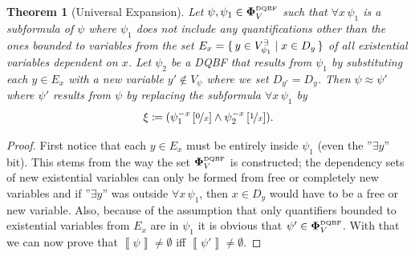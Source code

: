 \documentclass[
  digital, %
  twoside, %
  table,   %
  nolof,     %
  nolot,     %
]{fithesis3}
\let\setbuilder\set
\newcommand{\simpleset}[1]{\{{#1}\}}
\renewcommand{\set}[1]{\normalexpandarg\IfSubStr{#1}{|}{\setbuilder{#1}}{\simpleset{#1}}}
\newtheorem{theorem}{Theorem}[chapter] %
\theoremstyle{definition}
\theoremstyle{remark}
\newcommand{\seman}[1]{\left\llbracket {#1} \right\rrbracket}
\newcommand{\substitute}[2]{\left[ \nicefrac{#2}{#1} \right]}
\newcommand{\DQBF}[1]{\mathbf{\Phi}_{#1}^{\normalfont{\text{\tiny DQBF}}}}
\newcommand{\evars}[1]{V_{#1}^{\exists}}
\newcommand{\itholds}{\,}
\begin{document}
\begin{theorem}[Universal Expansion]
\label{thrm:unExpan}
  Let $\psi, \psi_1 \in \DQBF{V}$ such that $\forall x \itholds \psi_1$ is a subformula of $\psi$ where $\psi_1$ does not include any quantifications other than the ones bounded to variables from the set $E_{x} = \set{y \in \evars{\psi_1} | x \in D_y}$ of all existential variables dependent on $x$. Let $\psi_2$ be a DQBF that results from $\psi_1$ by substituting each $y \in E_x$ with a new variable $y' \not\in V_{\psi}$ where we set $D_{y'} = D_y$. Then $\psi \approx \psi'$ where $\psi'$ results from $\psi$ by replacing the subformula $\forall x \itholds \psi_1$ by 
  \[\xi \coloneqq (\psi_1^{-x}\substitute{x}{0} \land \psi_2^{-x}\substitute{x}{1}).\]
\end{theorem}
\begin{proof}
  First notice that each $y \in E_x$ must be entirely inside $\psi_1$ (even the ''$\exists y$'' bit). This stems from the way the set $\DQBF{V}$ is constructed; the dependency sets of new existential variables can only be formed from free or completely new variables and if ''$\exists y$'' was outside $\forall x \itholds \psi_1$, then $x \in D_y$ would have to be a free or new variable. Also, because of the assumption that only quantifiers bounded to existential variables from $E_x$
  are in $\psi_1$ it is obvious that $\psi' \in \DQBF{V}$. With that we can now prove that $\seman{\psi} \not= \emptyset$ iff $\seman{\psi'} \not= \emptyset$.
  

\end{proof}
\end{document}
